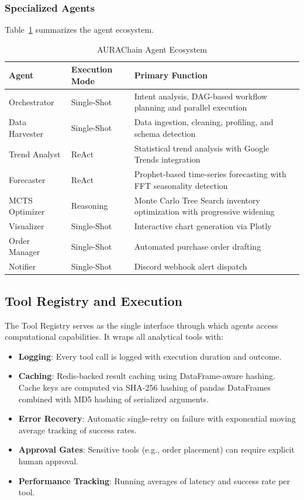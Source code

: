 \documentclass[conference]{IEEEtran}
\begin{document}
\subsubsection{Specialized Agents}

Table~\ref{tab:agents} summarizes the agent ecosystem.

\begin{table}[!t]
\caption{AURAChain Agent Ecosystem}
\label{tab:agents}
\centering
\small
\begin{tabular}{@{}lll@{}}
\toprule
\textbf{Agent} & \textbf{Execution Mode} & \textbf{Primary Function} \\
\midrule
Orchestrator & Single-Shot & Intent analysis, DAG-based workflow planning and parallel execution \\
Data Harvester & Single-Shot & Data ingestion, cleaning, profiling, and schema detection \\
Trend Analyst & ReAct & Statistical trend analysis with Google Trends integration \\
Forecaster & ReAct & Prophet-based time-series forecasting with FFT seasonality detection \\
MCTS Optimizer & Reasoning & Monte Carlo Tree Search inventory optimization with progressive widening \\
Visualizer & Single-Shot & Interactive chart generation via Plotly \\
Order Manager & Single-Shot & Automated purchase order drafting \\
Notifier & Single-Shot & Discord webhook alert dispatch \\
\bottomrule
\end{tabular}
\end{table}

\subsection{Tool Registry and Execution}

The Tool Registry serves as the single interface through which agents access computational capabilities. It wraps all analytical tools with:

\begin{itemize}
    \item \textbf{Logging}: Every tool call is logged with execution duration and outcome.
    \item \textbf{Caching}: Redis-backed result caching using DataFrame-aware hashing. Cache keys are computed via SHA-256 hashing of pandas DataFrames combined with MD5 hashing of serialized arguments.
    \item \textbf{Error Recovery}: Automatic single-retry on failure with exponential moving average tracking of success rates.
    \item \textbf{Approval Gates}: Sensitive tools (e.g., order placement) can require explicit human approval.
    \item \textbf{Performance Tracking}: Running averages of latency and success rate per tool.
\end{itemize}
\end{document}
